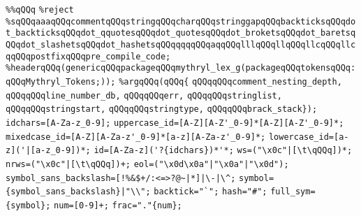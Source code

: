 \newline
\newline
\verb|%%qQQq|\newline
\verb|%reject|\newline
\verb|%sqQQqaaaqQQqcommentqQQqstringqQQqcharqQQqstringgapqQQqbackticksqQQqdot_backticksqQQqdot_qquotesqQQqdot_quotesqQQqdot_broketsqQQqdot_baretsqQQqdot_slashetsqQQqdot_hashetsqQQqqqqqQQqaqqQQqlllqQQqllqQQqllcqQQqllcqqQQqpostfixqQQqpre_compile_code;|\newline
\verb|%headerqQQq(genericqQQqpackageqQQqmythryl_lex_g(packageqQQqtokensqQQq:qQQqMythryl_Tokens;));|\newline
\verb|%argqQQq(qQQq{|\newline
\verb|qQQqqQQqcomment_nesting_depth,|\newline
\verb|qQQqqQQqline_number_db,|\newline
\verb|qQQqqQQqerr,|\newline
\verb|qQQqqQQqstringlist,|\newline
\verb|qQQqqQQqstringstart,|\newline
\verb|qQQqqQQqstringtype,|\newline
\verb|qQQqqQQqbrack_stack});|\newline
\verb|idchars=[A-Za-z_0-9];|\newline
\verb|uppercase_id=[A-Z][A-Z'_0-9]*[A-Z][A-Z'_0-9]*;|\newline
\verb|mixedcase_id=[A-Z][A-Za-z'_0-9]*[a-z][A-Za-z'_0-9]*;|\newline
\verb|lowercase_id=[a-z]('|\verb#|[a-z_0-9])*;#\newline
\verb|id=[A-Za-z]('?{idchars})*'*;|\newline
\verb|ws=("\x0c"|\verb#|[\t\qQQq])*;#\newline
\verb|nrws=("\x0c"|\verb#|[\t\qQQq])+;#\newline
\verb|eol=("\x0d\x0a"|\verb#|"\x0a"|"\x0d");#\newline
\verb|symbol_sans_backslash=[!%&$+/:<=>?@~|\verb#|*]|\-|\^;#\newline
\verb|symbol={symbol_sans_backslash}|\verb#|"\\";#\newline
\verb|backtick="`";|\newline
\verb|hash="#";|\newline
\verb|full_sym={symbol};|\newline
\verb|num=[0-9]+;|\newline
\verb|frac="."{num};|\newline
